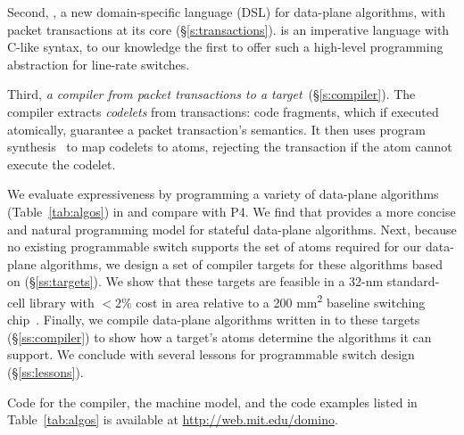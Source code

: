 Second, {\em \pktlanguage{}}, a new domain-specific language (DSL) for
data-plane algorithms, with packet transactions at its core
(\S\ref{s:transactions}).  \pktlanguage is an imperative language with C-like
syntax, to our knowledge the first to offer such a high-level programming
abstraction for line-rate switches.

Third, {\em a compiler from \pktlanguage packet transactions to a \absmachine
target}~(\S\ref{s:compiler}). The \pktlanguage compiler extracts {\em codelets}
from  transactions: code fragments, which if executed atomically, guarantee a
packet transaction's semantics. It then uses program
synthesis~\cite{sketch_asplos} to map codelets to atoms, rejecting the
transaction if the atom cannot execute the codelet.

We evaluate expressiveness by programming a variety of data-plane algorithms
(Table~\ref{tab:algos}) in \pktlanguage and compare with P4. We find that
\pktlanguage provides a more concise and natural programming model for stateful
data-plane algorithms.  Next, because no existing programmable switch supports
the set of atoms required for our data-plane algorithms, we design a set of
compiler targets for these algorithms based on \absmachine
(\S\ref{ss:targets}).  We show that these targets are feasible in a 32-nm
standard-cell library with $< 2\%$ cost in area relative to a 200
\si{\milli\metre\squared} baseline switching chip~\cite{gibb_parsing}.
Finally, we compile data-plane algorithms written in \pktlanguage to these
targets (\S\ref{ss:compiler}) to show how a target's atoms determine the
algorithms it can support. We conclude with several lessons for programmable
switch design (\S\ref{ss:lessons}).

Code for the \pktlanguage compiler, the \absmachine machine model, and the code
examples listed in Table~\ref{tab:algos} is available at
\url{http://web.mit.edu/domino}.
